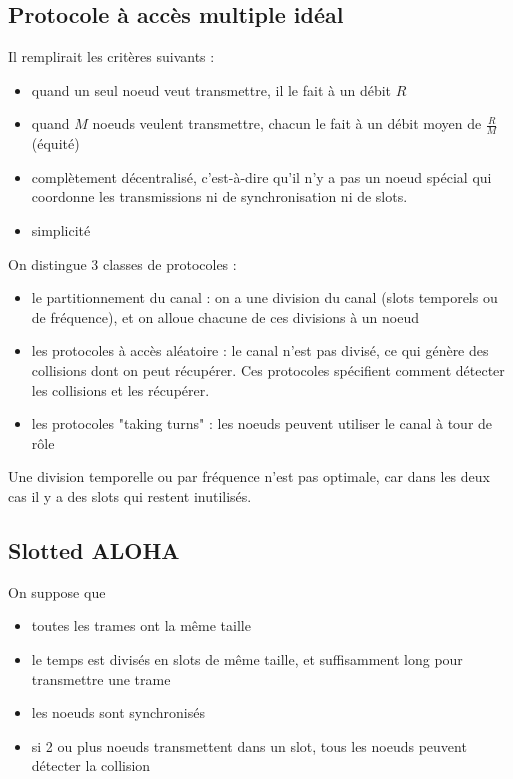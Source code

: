 	\subsection{Protocole à accès multiple idéal}
	
	Il remplirait les critères suivants :
	
	\begin{itemize}
		\item quand un seul noeud veut transmettre, il le fait à un débit $R$
		\item quand $M$ noeuds veulent transmettre, chacun le fait à un débit moyen de $\frac{R}{M}$ (équité)
		\item complètement décentralisé, c'est-à-dire qu'il n'y a pas un noeud spécial qui coordonne les transmissions ni de synchronisation ni de slots.
		\item simplicité
	\end{itemize}		
	
	
	On distingue 3 classes de protocoles :
	
	\begin{itemize}
		\item le partitionnement du canal : on a une division du canal (slots temporels ou de fréquence), et on alloue chacune de ces divisions à un noeud
		\item les protocoles à accès aléatoire : le canal n'est pas divisé, ce qui génère des collisions dont on peut récupérer. Ces protocoles spécifient comment détecter les collisions et les récupérer.
		\item les protocoles "taking turns" : les noeuds peuvent utiliser le canal à tour de rôle
	\end{itemize}
	
	Une division temporelle ou par fréquence n'est pas optimale, car dans les deux cas il y a des slots qui restent inutilisés.


	\subsection{Slotted ALOHA}
	
	On suppose que
	
	\begin{itemize}
		\item toutes les trames ont la même taille
		\item le temps est divisés en slots de même taille, et suffisamment long pour transmettre une trame
		\item les noeuds sont synchronisés
		\item si 2 ou plus noeuds transmettent dans un slot, tous les noeuds peuvent détecter la collision
	\end{itemize}
	

